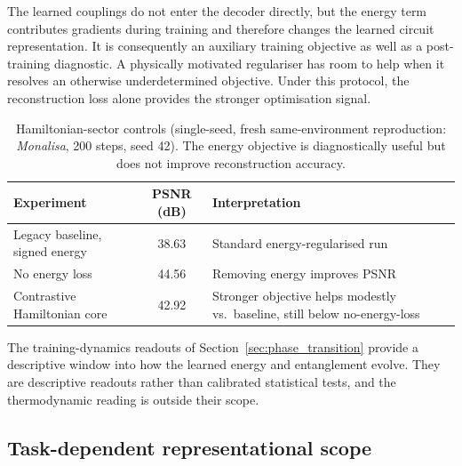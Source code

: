 \documentclass[pdflatex,sn-basic]{sn-jnl}
\begin{document}
The learned couplings do not enter the decoder directly, but the energy term contributes gradients during training and therefore changes the learned circuit representation. It is consequently an auxiliary training objective as well as a post-training diagnostic. A physically motivated regulariser has room to help when it resolves an otherwise underdetermined objective. Under this protocol, the reconstruction loss alone provides the stronger optimisation signal.

\begin{table}[t]
  \centering
  \caption{Hamiltonian-sector controls (single-seed, fresh same-environment
           reproduction: \textit{Monalisa}, 200 steps, seed 42). The energy
           objective is diagnostically useful but does not improve reconstruction
           accuracy. }
  \label{tab:hamiltonian_controls}
  \begin{tabularx}{\textwidth}{@{}L{0.30\textwidth} c Y@{}}
    \toprule
    Experiment                      & PSNR (dB) & Interpretation \\
    \midrule
    Legacy baseline, signed energy  & 38.63     & Standard energy-regularised run \\
    No energy loss                  & 44.56     & Removing energy improves PSNR \\
    Contrastive Hamiltonian core    & 42.92     & Stronger objective helps modestly
                                                  vs.\ baseline, still below
                                                  no-energy-loss \\
    \bottomrule
  \end{tabularx}
\end{table}

The training-dynamics readouts of Section~\ref{sec:phase_transition} provide a
descriptive window into how the learned energy and entanglement evolve. They are
descriptive readouts rather than calibrated statistical tests, and the
thermodynamic reading is outside their scope.

\subsection{Task-dependent representational scope}
\label{sec:dequant}
\label{sec:representativeness}
\end{document}
